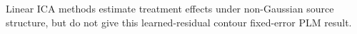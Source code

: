Linear ICA methods estimate treatment effects under non-Gaussian source structure, but do not give this learned-residual contour fixed-error PLM result.